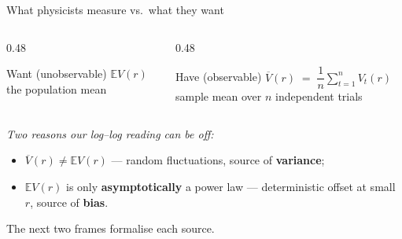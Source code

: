 \documentclass[10pt, aspectratio=169, xcolor={table}]{beamer}
\newcommand{\E}{\mathbb{E}}
\begin{document}
\begin{frame}{What physicists measure vs.\ what they want}
  \begin{columns}[t]
    \begin{column}{0.48\textwidth}
      \begin{block}{Want (unobservable)}
        \centering $\E V(r)$ \\[0.2em]
        \footnotesize the population mean
      \end{block}
    \end{column}
    \begin{column}{0.48\textwidth}
      \begin{block}{Have (observable)}
        \centering $\overline V(r) \;=\; \dfrac{1}{n}\sum_{t=1}^{n} V_t(r)$ \\[0.2em]
        \footnotesize sample mean over $n$ independent trials
      \end{block}
    \end{column}
  \end{columns}

  \vspace{0.8em}
  \textit{Two reasons our log--log reading can be off:}
  \begin{itemize}
    \item[(a)] $\overline V(r) \ne \E V(r)$ --- random fluctuations,
               source of \textbf{variance};
    \item[(b)] $\E V(r)$ is only \textbf{asymptotically} a power law
               --- deterministic offset at small $r$, source of
               \textbf{bias}.
    \end{itemize}

  \vspace{0.4em}
  The next two frames formalise each source.
\end{frame}
\end{document}
